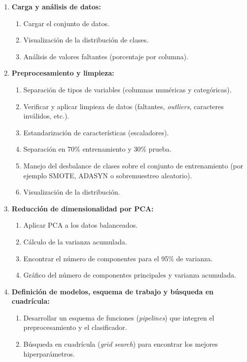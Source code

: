 \begin{enumerate}
    \item \textbf{Carga y análisis de datos:}
          \begin{enumerate}
              \item Cargar el conjunto de datos.
              \item Visualización de la distribución de clases.
              \item Análisis de valores faltantes (porcentaje por columna).
          \end{enumerate}

    \item \textbf{Preprocesamiento y limpieza:}
          \begin{enumerate}
              \item Separación de tipos de variables (columnas numéricas y categóricas).
              \item Verificar y aplicar limpieza de datos (faltantes,
                    \textit{outliers}, caracteres inválidos, etc.).
              \item Estandarización de características (escaladores).
              \item Separación en 70\% entrenamiento y 30\% prueba.
              \item Manejo del desbalance de clases sobre el conjunto de
                    entrenamiento (por ejemplo SMOTE, ADASYN o sobremuestreo
                    aleatorio).
              \item Visualización de la distribución.
          \end{enumerate}

    \item \textbf{Reducción de dimensionalidad por PCA:}
          \begin{enumerate}
              \item Aplicar PCA a los datos balanceados.
              \item Cálculo de la varianza acumulada.
              \item Encontrar el número de componentes para el 95\% de varianza.
              \item Gráfico del número de componentes principales y varianza
                    acumulada.
          \end{enumerate}

    \item \textbf{Definición de modelos, esquema de trabajo y búsqueda en
              cuadrícula:}
          \begin{enumerate}
              \item Desarrollar un esquema de funciones (\textit{pipelines})
                    que integren el preprocesamiento y el clasificador.
              \item Búsqueda en cuadrícula (\textit{grid search}) para encontrar
                    los mejores hiperparámetros.
          \end{enumerate}


\end{enumerate}
